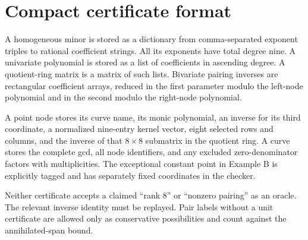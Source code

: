 \documentclass[11pt]{article}
\theoremstyle{definition}\newtheorem{definition}[theorem]{Definition}
\begin{document}
\section{Compact certificate format}
A homogeneous minor is stored as a dictionary from comma-separated exponent triples to rational coefficient strings. All its exponents have total degree nine. A univariate polynomial is stored as a list of coefficients in ascending degree. A quotient-ring matrix is a matrix of such lists. Bivariate pairing inverses are rectangular coefficient arrays, reduced in the first parameter modulo the left-node polynomial and in the second modulo the right-node polynomial.

A point node stores its curve name, its monic polynomial, an inverse for its third coordinate, a normalized nine-entry kernel vector, eight selected rows and columns, and the inverse of that $8\times8$ submatrix in the quotient ring. A curve stores the complete gcd, all node identifiers, and any excluded zero-denominator factors with multiplicities. The exceptional constant point in Example B is explicitly tagged and has separately fixed coordinates in the checker.

Neither certificate accepts a claimed ``rank 8'' or ``nonzero pairing'' as an oracle. The relevant inverse identity must be replayed. Pair labels without a unit certificate are allowed only as conservative possibilities and count against the annihilated-span bound.
\end{document}
